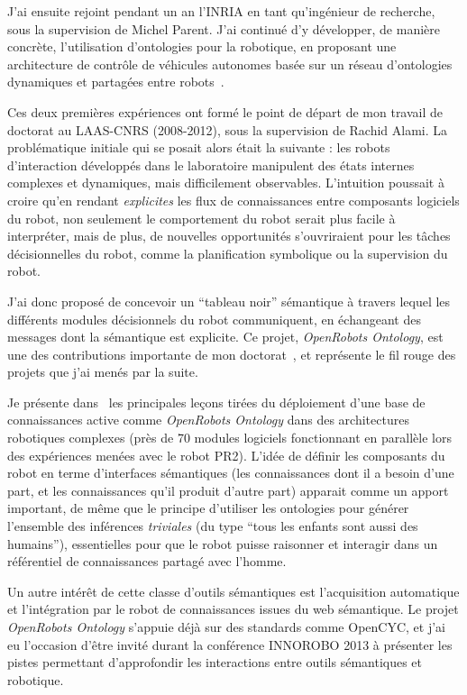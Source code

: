 \documentclass[a4paper]{article}
\begin{document}
J'ai ensuite rejoint pendant un an l'INRIA en tant qu'ingénieur de recherche,
sous la supervision de Michel Parent.  J'ai continué d'y développer, de manière
concrète, l'utilisation d'ontologies pour la robotique, en proposant une
architecture de contrôle de véhicules autonomes basée sur un réseau d'ontologies
dynamiques et partagées entre robots~\cite{mehani2007networking}.

Ces deux premières expériences ont formé le point de départ de mon travail de
doctorat au LAAS-CNRS (2008-2012), sous la supervision de Rachid Alami. La
problématique initiale qui se posait alors était la suivante : les robots
d'interaction développés dans le laboratoire manipulent des états internes
complexes et dynamiques, mais difficilement observables. L'intuition poussait à
croire qu'en rendant \emph{explicites} les flux de connaissances entre
composants logiciels du robot, non seulement le comportement du robot serait
plus facile à interpréter, mais de plus, de nouvelles opportunités s'ouvriraient
pour les tâches décisionnelles du robot, comme la planification symbolique ou la
supervision du robot.

J'ai donc proposé de concevoir un ``tableau noir'' sémantique à travers lequel
les différents modules décisionnels du robot communiquent, en échangeant des
messages dont la sémantique est explicite. Ce projet, \emph{OpenRobots
Ontology}, est une des contributions importante de mon
doctorat~\cite{Lemaignan2010}, et représente le fil rouge des projets
que j'ai menés par la suite.

Je présente dans~\cite{lemaignan2013explicit} les principales leçons tirées du
déploiement d'une base de connaissances active comme \emph{OpenRobots Ontology}
dans des architectures robotiques complexes (près de 70 modules logiciels
fonctionnant en parallèle lors des expériences menées avec le robot PR2). L'idée
de définir les composants du robot en terme d'interfaces sémantiques (les
connaissances dont il a besoin d'une part, et les connaissances qu'il produit
d'autre part) apparait comme un apport important, de même que le principe
d'utiliser les ontologies pour générer l'ensemble des inférences
\emph{triviales} (du type ``tous les enfants sont aussi des humains''),
essentielles pour que le robot puisse raisonner et interagir dans un référentiel
de connaissances partagé avec l'homme.

Un autre intérêt de cette classe d'outils sémantiques est l'acquisition
automatique et l'intégration par le robot de connaissances issues du web
sémantique. Le projet \emph{OpenRobots Ontology} s'appuie déjà sur des
standards comme {\sc OpenCYC}, et j'ai eu l'occasion d'être invité durant la
conférence INNOROBO 2013 à présenter les pistes permettant d'approfondir les
interactions entre outils sémantiques et robotique.
\end{document}
